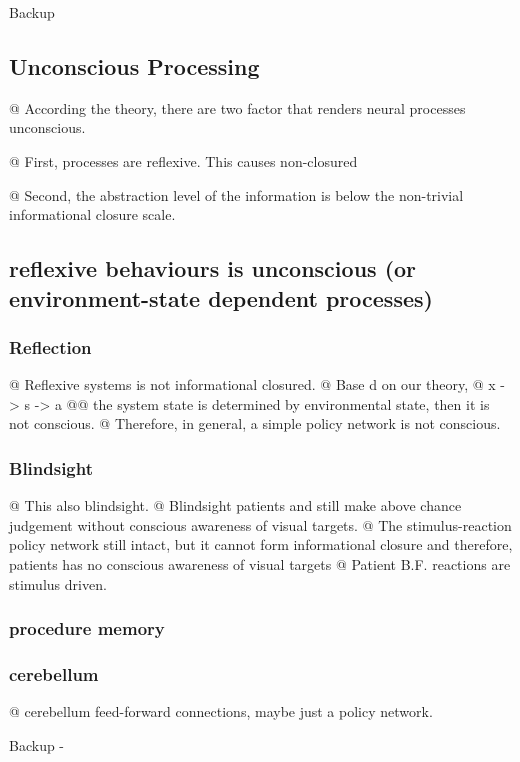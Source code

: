 \documentclass[utf8]{article}
\newenvironment{ants}
			{
			 \begin{easylist}[itemize]
		 	}
			{
			\end{easylist}
			} %
\newcommand{\needref}[1]{%
			\ifthenelse{\equal{#1}{}}{%
				\todo[color=White, linecolor=Orange, bordercolor=Orange]{\textcolor{Orange}{Ref}}}{%
				\todo[color=White, linecolor=Orange, bordercolor=Orange]{\textcolor{Orange}{Ref: #1}}%
			}%
		}
\newenvironment{backup}
    {
        
        \begin{tcolorbox}[enhanced,
            title=-,
            size=small,
            colbacktitle=black!70!white,
            colback=black!10!white,            
            drop fuzzy shadow,
            fontupper=\small,
            boxrule=0.4pt,
            sharp corners]
            Backup
        \end{tcolorbox}
    }
    {
        \begin{tcolorbox}[enhanced,
            halign=flush right,
            halign title=right,
            size=small,
            colbacktitle=black!10!white,
            colback=black!70!white,
            drop fuzzy shadow,
            fontupper=\small,
            boxrule=0.4pt,
            colupper=White,
            sharp corners]
            Backup -
        \end{tcolorbox}    
    }
\begin{document}
\begin{backup}
		\subsection{Unconscious Processing}
		\begin{ants}
			@ According the theory, there are two factor that renders neural processes unconscious.

			@ First, processes are reflexive. This causes non-closured

			@ Second, the abstraction level of the information is below the non-trivial informational closure scale.
		\end{ants}



		\subsection{reflexive behaviours is unconscious (or environment-state dependent processes)}\label{sec:reflexive}
		\subsubsection{Reflection}
		\begin{ants}
			@ Reflexive systems is not informational closured.
			@ Base	d on our theory,
			@ x -> s -> a
			@@ the system state is determined by environmental state, then it is not conscious.
			@ Therefore, in general, a simple policy network is not conscious.
		\end{ants}

		\subsubsection{Blindsight}
		\begin{ants}
			@ This also blindsight.
			@ Blindsight patients and still make above chance judgement without conscious awareness of visual targets.
			@ The stimulus-reaction policy network still intact, but it cannot form informational closure and therefore, patients has no conscious awareness of visual  targets
			@ Patient B.F. reactions are stimulus driven.
		\end{ants}

		\subsubsection{procedure memory}

		\subsubsection{cerebellum}
		\begin{ants}
			@ cerebellum feed-forward connections, maybe just a policy network.\needref{cerebellum}
		\end{ants}


\end{backup}
\end{document}
